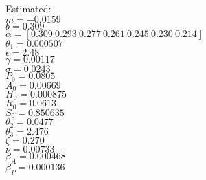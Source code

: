 \documentclass[12pt]{article}
\begin{document}
\begin{multicols}{2}
Estimated: \\
$m=-0.0159$ \\
$b=0.309$\\
$\alpha=[0.309  \   0.293  \   0.277    \   0.261 \    0.245 \     0.230  \  0.214  ]$ \\
$\theta_1=0.000507 $\\
$\epsilon=2.48$ \\
$\gamma=0.00117$\\
$\sigma=0.0243$ \\
$P_0=0.0805$ \\
$A_0=0.00669$ \\
$H_0=0.000875$ \\
$R_0=0.0613$ \\
$S_0=0.850635$ \\
$\theta_2=0.0477$ \\
$\theta_3=2.476$ \\
$\zeta=0.270$ \\
$\nu=0.00733$ \\ 
$\beta_A=0.000468$ \\
$\beta_P=0.000136$ \\
\end{multicols}
\end{document}
